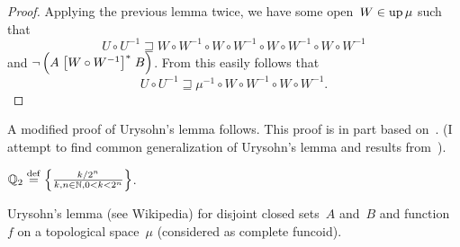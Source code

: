 \begin{proof}
Applying the previous lemma twice, we have some open~$W\in\operatorname{up}\mu$ such that
\[ U\circ U^{-1} \sqsupseteq W \circ W^{-1}\circ W \circ W^{- 1} \circ W \circ W^{-1}\circ W \circ W^{- 1} \]
and $\neg \left( A \mathrel{\left[W \circ W^{-1}\right]^{\ast}} B \right)$.
From this easily follows that \[ U \circ U^{- 1} \sqsupseteq \mu^{-1} \circ W \circ W^{-1}\circ W \circ W^{- 1}. \]
\end{proof}

A modified proof of Urysohn's lemma follows. This proof is in part based on~\cite{2014arXiv1410.1504B}.
(I attempt to find common generalization of Urysohn's lemma and results from~\cite{2014arXiv1410.1504B}).

$\mathbb{Q}_2 \overset{\mathrm{def}}{=} \left\{ \frac{ k/2^n }{k, n \in \mathbb{N}, 0 < k < 2^n }\right\}$.

\begin{thm}
Urysohn's lemma (see Wikipedia) for disjoint closed sets~$A$ and~$B$ and function~$f$ on a topological space~$\mu$
(considered as complete funcoid). 
\end{thm}

